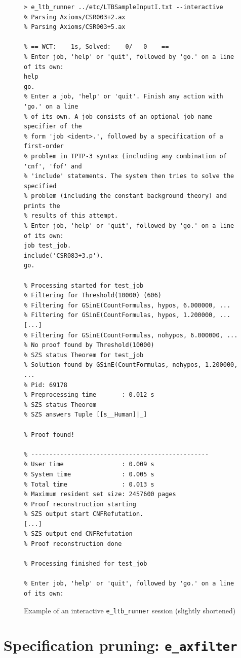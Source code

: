 \documentclass{report}
\begin{document}
\begin{figure}
  \centering
  \footnotesize
\begin{verbatim}
> e_ltb_runner ../etc/LTBSampleInputI.txt --interactive
% Parsing Axioms/CSR003+2.ax
% Parsing Axioms/CSR003+5.ax

% == WCT:    1s, Solved:    0/   0    ==
% Enter job, 'help' or 'quit', followed by 'go.' on a line of its own:
help
go.
% Enter a job, 'help' or 'quit'. Finish any action with 'go.' on a line
% of its own. A job consists of an optional job name specifier of the
% form 'job <ident>.', followed by a specification of a first-order
% problem in TPTP-3 syntax (including any combination of 'cnf', 'fof' and
% 'include' statements. The system then tries to solve the specified
% problem (including the constant background theory) and prints the
% results of this attempt.
% Enter job, 'help' or 'quit', followed by 'go.' on a line of its own:
job test_job.
include('CSR083+3.p').
go.

% Processing started for test_job
% Filtering for Threshold(10000) (606)
% Filtering for GSinE(CountFormulas, hypos, 6.000000, ...
% Filtering for GSinE(CountFormulas, hypos, 1.200000, ...
[...]
% Filtering for GSinE(CountFormulas, nohypos, 6.000000, ...
% No proof found by Threshold(10000)
% SZS status Theorem for test_job
% Solution found by GSinE(CountFormulas, nohypos, 1.200000, ...
% Pid: 69178
% Preprocessing time       : 0.012 s
% SZS status Theorem
% SZS answers Tuple [[s__Human]|_]

% Proof found!

% -------------------------------------------------
% User time                : 0.009 s
% System time              : 0.005 s
% Total time               : 0.013 s
% Maximum resident set size: 2457600 pages
% Proof reconstruction starting
% SZS output start CNFRefutation.
[...]
% SZS output end CNFRefutation
% Proof reconstruction done

% Processing finished for test_job

% Enter job, 'help' or 'quit', followed by 'go.' on a line of its own:
\end{verbatim}
  \caption{Example of an interactive \texttt{e\_ltb\_runner} session
    (slightly shortened)}
  \label{fig:lbtsession}
\end{figure}

\section{Specification pruning: \texttt{e\_axfilter}}
\end{document}
